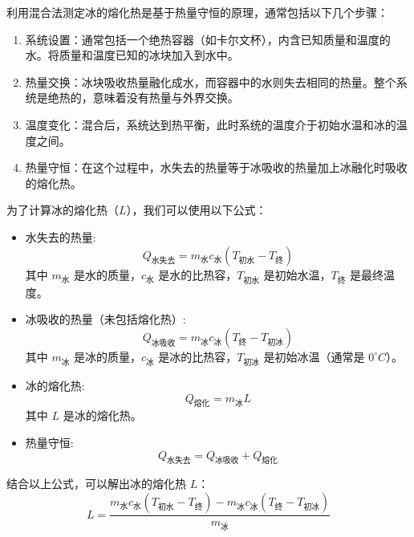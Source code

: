 \documentclass[dvipsnames, svgnames,a4paper,11pt]{article}
\begin{document}
	利用混合法测定冰的熔化热是基于热量守恒的原理，通常包括以下几个步骤：
	\begin{enumerate}
		\item 系统设置：通常包括一个绝热容器（如卡尔文杯），内含已知质量和温度的水。将质量和温度已知的冰块加入到水中。
		\item 热量交换：冰块吸收热量融化成水，而容器中的水则失去相同的热量。整个系统是绝热的，意味着没有热量与外界交换。
		\item 温度变化：混合后，系统达到热平衡，此时系统的温度介于初始水温和冰的温度之间。
		\item 热量守恒：在这个过程中，水失去的热量等于冰吸收的热量加上冰融化时吸收的熔化热。
	\end{enumerate}
	
	为了计算冰的熔化热（\( L \)），我们可以使用以下公式：
	
	\begin{itemize}
		\item 水失去的热量:
		\[ Q_{\text{水失去}} = m_{\text{水}} c_{\text{水}} (T_{\text{初水}} - T_{\text{终}}) \]
		其中 \( m_{\text{水}} \) 是水的质量，\( c_{\text{水}} \) 是水的比热容，\( T_{\text{初水}} \) 是初始水温，\( T_{\text{终}} \) 是最终温度。
		
		\item 冰吸收的热量（未包括熔化热）:
		\[ Q_{\text{冰吸收}} = m_{\text{冰}} c_{\text{冰}} (T_{\text{终}} - T_{\text{初冰}}) \]
		其中 \( m_{\text{冰}} \) 是冰的质量，\( c_{\text{冰}} \) 是冰的比热容，\( T_{\text{初冰}} \) 是初始冰温（通常是 \( 0^\circ C \)）。
		
		\item 冰的熔化热:
		\[ Q_{\text{熔化}} = m_{\text{冰}} L \]
		其中 \( L \) 是冰的熔化热。
		
		\item 热量守恒:
		\[ Q_{\text{水失去}} = Q_{\text{冰吸收}} + Q_{\text{熔化}} \]
	\end{itemize}
	
	结合以上公式，可以解出冰的熔化热 \( L \)：
	\[ L = \frac{m_{\text{水}} c_{\text{水}} (T_{\text{初水}} - T_{\text{终}}) - m_{\text{冰}} c_{\text{冰}} (T_{\text{终}} - T_{\text{初冰}})}{m_{\text{冰}}} \]
	
	
\end{document}
